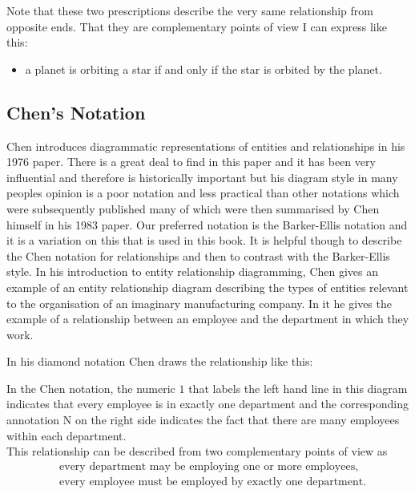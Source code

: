 Note that these two prescriptions describe the very same relationship from opposite ends. That they are complementary points of view I can express like this:

\begin{itemize}
\item a planet is orbiting a star if and only if the star is orbited by the planet.
\end{itemize}
\subsection*{Chen's Notation}
\mynote
Chen introduces diagrammatic representations of entities and relationships in his 
1976 paper. There is a great deal to find in this paper and it has been very influential and therefore is historically important but his diagram style in many peoples opinion is a poor notation and less practical than other notations which were subsequently published many of which were then summarised by Chen himself in his 1983 paper. 
Our preferred notation is the Barker-Ellis notation and it is a variation on this that is used in this book. 
It is helpful though
to describe the Chen notation for relationships and then to contrast with the Barker-Ellis style.
\mynote
In his introduction to entity relationship diagramming, Chen gives an example of an entity relationship diagram describing the types of entities relevant to the organisation of an imaginary manufacturing company.
In it he gives the example of a relationship between an employee and the department in which they work. 

\noindent In his diamond notation Chen draws the relationship like this:
\begin{center}
\scalebox{0.9}{}
\end{center}

\noindent In the Chen notation, the numeric $1$ that labels the left hand line in this diagram indicates that every employee is in exactly one department and the corresponding annotation N on the right side indicates the fact that there are many employees within each department. \\

\noindent This relationship can be described from  two complementary points of view as
\begin{align}
\label{employingText}&\mbox{every department may be employing one or more employees,} \\
\label{employedByText}&\mbox{every employee must be employed by exactly one department.}
\end{align}


